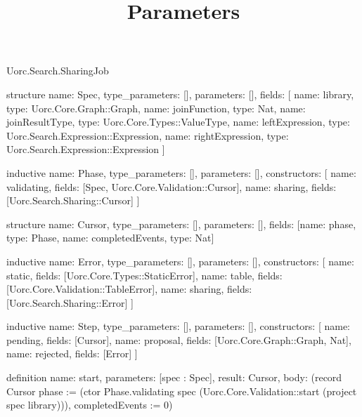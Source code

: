 \begin{lexlean}{Uorc.Search.SharingJob}
\title{Parameters}
\begin{semanticmodule}
structure{
  name: Spec,
  type_parameters: [],
  parameters: [],
  fields: [
    {name: library, type: Uorc.Core.Graph::Graph},
    {name: joinFunction, type: Nat},
    {name: joinResultType, type: Uorc.Core.Types::ValueType},
    {name: leftExpression, type: Uorc.Search.Expression::Expression},
    {name: rightExpression, type: Uorc.Search.Expression::Expression}
  ]
}

inductive{
  name: Phase,
  type_parameters: [],
  parameters: [],
  constructors: [
    {name: validating, fields: [Spec, Uorc.Core.Validation::Cursor]},
    {name: sharing, fields: [Uorc.Search.Sharing::Cursor]}
  ]
}

structure{
  name: Cursor,
  type_parameters: [],
  parameters: [],
  fields: [{name: phase, type: Phase}, {name: completedEvents, type: Nat}]
}

inductive{
  name: Error,
  type_parameters: [],
  parameters: [],
  constructors: [
    {name: static, fields: [Uorc.Core.Types::StaticError]},
    {name: table, fields: [Uorc.Core.Validation::TableError]},
    {name: sharing, fields: [Uorc.Search.Sharing::Error]}
  ]
}

inductive{
  name: Step,
  type_parameters: [],
  parameters: [],
  constructors: [
    {name: pending, fields: [Cursor]},
    {name: proposal, fields: [Uorc.Core.Graph::Graph, Nat]},
    {name: rejected, fields: [Error]}
  ]
}

definition{
  name: start,
  parameters: [spec : Spec],
  result: Cursor,
  body: (record Cursor {phase := (ctor Phase.validating spec (Uorc.Core.Validation::start (project spec library))), completedEvents := 0})
}


\end{semanticmodule}
\end{lexlean}
